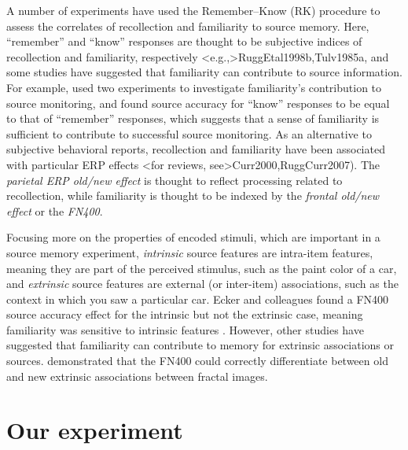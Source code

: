 \documentclass[12pt,doc]{apa}
\begin{document}
A number of experiments have used the Remember--Know (RK) procedure to
assess the correlates of recollection and familiarity to source
memory.  Here, ``remember'' and ``know'' responses are thought to be
subjective indices of recollection and familiarity, respectively
\shortcite<e.g.,>{RuggEtal1998b,Tulv1985a}, and some studies have suggested
that familiarity can contribute to source information.  For example,
 used two experiments to investigate familiarity's
contribution to source monitoring, and found source accuracy for
``know'' responses to be equal to that of ``remember'' responses,
which suggests that a sense of familiarity is sufficient to contribute
to successful source monitoring.  As an alternative to subjective
behavioral reports, recollection and familiarity have been associated
with particular ERP effects \shortcite<for reviews,
see>{Curr2000,RuggCurr2007}).  The {\it parietal ERP old/new effect}
is thought to reflect processing related to recollection, while
familiarity is thought to be indexed by the {\it frontal old/new
  effect} or the {\it FN400}.

Focusing more on the properties of encoded stimuli, which are
important in a source memory experiment, {\it intrinsic} source
features are intra-item features, meaning they are part of the
perceived stimulus, such as the paint color of a car, and {\it
  extrinsic} source features are external (or inter-item)
associations, such as the context in which you saw a particular car.
Ecker and colleagues found a FN400 source accuracy effect for the
intrinsic but not the extrinsic case, meaning familiarity was
sensitive to intrinsic features
.  However, other studies have
suggested that familiarity can contribute to memory for extrinsic
associations or sources.   demonstrated that
the FN400 could correctly differentiate between old and new extrinsic
associations between fractal images.

\section*{Our experiment}
\end{document}
